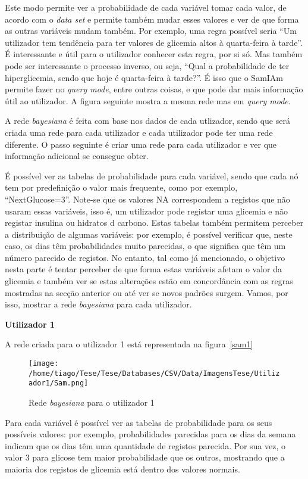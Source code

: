 Este modo permite ver a probabilidade de cada variável tomar cada valor, de acordo com o \textit{data set} e permite também mudar esses valores e ver de que forma as outras variáveis mudam também. Por exemplo, uma regra possível seria ``Um utilizador tem tendência para ter valores de glicemia altos à quarta-feira à tarde''. É interessante e útil para o utilizador conhecer esta regra, por si só. Mas também pode ser interessante o processo inverso, ou seja, ``Qual a probabilidade de ter hiperglicemia, sendo que hoje é quarta-feira à tarde?''. É isso que o \ac{SamIAm} permite fazer no \textit{query mode}, entre outras coisas, e que pode dar mais informação útil ao utilizador. A figura seguinte mostra a mesma rede mas em \textit{query mode}.

A rede \textit{bayesiana} é feita com base nos dados de cada utlizador, sendo que será criada uma rede para cada utilizador e cada utilizador pode ter uma rede diferente. O passo seguinte é criar uma rede para cada utilizador e ver que informação adicional se consegue obter.

É possível ver as tabelas de probabilidade para cada variável, sendo que cada nó tem por predefinição o valor mais frequente, como por exemplo, ``Next\textunderscore Glucose=3''. Note-se que os valores \ac{NA} correspondem a registos que não usaram essas variáveis, isso é, um utilizador pode registar uma glicemia e não registar insulina ou hidratos d carbono. Estas tabelas também permitem perceber a distribuição de algumas variáveis: por exemplo, é possível verificar que, neste caso, os dias têm probabilidades muito parecidas, o que significa que têm um número parecido de registos. No entanto, tal como já mencionado, o objetivo nesta parte é tentar perceber de que forma estas variáveis afetam o valor da glicemia e também ver se estas alterações estão em concordância com as regras mostradas na secção anterior ou até ver se novos padrões surgem. Vamos, por isso, mostrar a rede \textit{bayesiana} para cada utilizador. 

\textbf{Utilizador 1}

A rede criada para o utilizador 1 está representada na figura~\ref{sam1}

\begin{figure}[H]
\centering
\texttt{[image: /home/tiago/Tese/Tese/Databases/CSV/Data/ImagensTese/Utilizador1/Sam.png]}
\caption{Rede \textit{bayesiana} para o utilizador 1}
\label{fig:sam1}
\end{figure}
Para cada variável é possível ver as tabelas de probabilidade para os seus possíveis valores: por exemplo, probabilidades parecidas para os dias da semana indicam que os dias têm uma quantidade de registos parecida. Por sua vez, o valor 3 para glicose tem maior probabilidade que os outros, mostrando que a maioria dos registos de glicemia está dentro dos valores normais.

